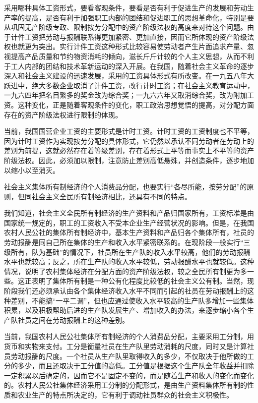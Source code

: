 \documentclass{book}
\begin{document}
采用哪种具体工资形式，要看客观条件，要看是否有利于促进生产的发展和劳动生产率的提高，是否有利于加强职工内部的团结和促进职工的思想革命化，特别是要从巩固无产阶级专政、限制按劳分配中的资产阶级法权的高度来对待这个问题。由于计件工资把劳动与报酬联系得更加紧密、更加直接，因而它所体现的资产阶级法权也就更为突出。实行计件工资这种形式比较容易使劳动者产生片面追求产量、忽视提高产品质量和节约物资消耗的倾向，滋长斤斤计较的个人主义思想，从而不利于工人内部的团结和技术革新运动的深入开展。在我国，随着社会主义革命的逐步深入和社会主义建设的迅速发展，采用的工资具体形式有所改变。在一九五八年大跃进中，绝大多数企业取消了计件工资，改行计时工资；在社会主义教育运动中，一九六四年把名目繁多的奖金改为综合奖；一九六六年又取消综合奖，改为附加工资。这种变化，正是随着客观条件的变化，职工政治思想觉悟的提高，对分配方面存在的资产阶级法权进行限制的体现。

当前，我国国营企业工资的主要形式是计时工资。计时工资的工资制度也不平等，因为计时工资作为实现按劳分配的具体形式，它仍然以承认不同劳动者在劳动上的差别为前提，这就必然存在着等级差别，存在着形式上平等而事实上不平等的资产阶级法权。因此，必须加以限制，注意防止差别高低悬殊，并创造条件，逐步地加以缩小以至消灭。

社会主义集体所有制经济的个人消费品分配，也要实行“各尽所能，按劳分配”的原则，但同社会主义全民所有制经济相比，还具有不同的特点。

我们知道，社会主义全民所有制经济的生产资料和产品归国家所有，工资标准是由国家统一规定的，职工的工资收入不受本企业生产经营状况的影响。但是，在我国农村人民公社的集体所有制经济中，基本生产资料和产品归各个集体所有，社员的劳动报酬是同自己所在集体的生产和收入水平紧密联系的。在现阶段一般实行“三级所有，队为基础”的情况下，社员所在生产队的收入水平较高，他们的劳动报酬水平也就较高；反之，所在生产队的收入水平较低，劳动报酬水平也就较低。这种情况，说明了农村集体经济在分配方面的资产阶级法权，较之全民所有制更为多一些。这正表明了集体所有制是一种公有化程度比较低的社会主义公有制。当然，现阶段我们还必须承认由各个集体经济收入水平不同而引起的社员在劳动报酬上的这种差别，不能搞“一平二调”，但也应通过使收入水平较高的生产队多增加一些集体积累，以及积极帮助后进的生产队发展生产、增加收入的办法，来逐步缩小各个生产队社员之间在劳动报酬上的这种差别。

当前，我国农村人民公社集体所有制经济的个人消费品分配，主要采用工分制，用货币和实物来支付。工分是衡量社员在生产队里劳动消耗的尺度，同时又是计算社员劳动报酬的尺度。一个社员从生产队里取得收入的多少，不仅取决于他所做的工分的多少，而且还取决于工分值的高低。工分值是根据这个生产队全年收益并扣除一定积累以后确定的，因而它不是固定不变的，而是随着生产和收入的变化而变化的。农村人民公社集体经济采用工分制的分配形式，是由生产资料集体所有制的性质和农业生产的特点所决定的，它有利于调动社员群众的社会主义积极性。
\end{document}
